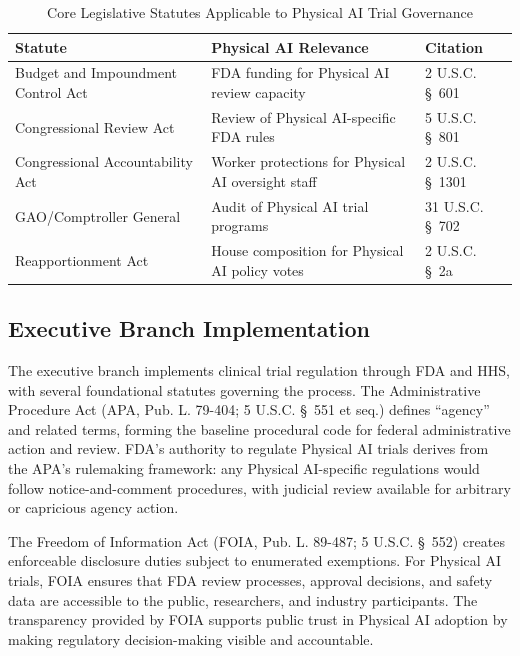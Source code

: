 \begin{table}[H]
\centering
\caption{Core Legislative Statutes Applicable to Physical AI Trial Governance}
\label{tab:legislative-statutes}
\small
\begin{tabularx}{\textwidth}{l X l}
\toprule
\textbf{Statute} & \textbf{Physical AI Relevance} & \textbf{Citation} \\
\midrule
Budget and Impoundment Control Act & FDA funding for Physical AI review capacity & 2 U.S.C. \S~601 \\
Congressional Review Act & Review of Physical AI-specific FDA rules & 5 U.S.C. \S~801 \\
Congressional Accountability Act & Worker protections for Physical AI oversight staff & 2 U.S.C. \S~1301 \\
GAO/Comptroller General & Audit of Physical AI trial programs & 31 U.S.C. \S~702 \\
Reapportionment Act & House composition for Physical AI policy votes & 2 U.S.C. \S~2a \\
\bottomrule
\end{tabularx}
\end{table}

\subsection{Executive Branch Implementation}
\label{subsec:executive}

The executive branch implements clinical trial regulation through FDA and HHS,
with several foundational statutes governing the process. The Administrative
Procedure Act (APA, Pub. L. 79-404; 5 U.S.C. \S~551 et seq.) defines
``agency'' and related terms, forming the baseline procedural code for federal
administrative action and review. FDA's authority to regulate Physical AI trials
derives from the APA's rulemaking framework: any Physical AI-specific
regulations would follow notice-and-comment procedures, with judicial review
available for arbitrary or capricious agency action.

The Freedom of Information Act (FOIA, Pub. L. 89-487; 5 U.S.C. \S~552)
creates enforceable disclosure duties subject to enumerated exemptions. For
Physical AI trials, FOIA ensures that FDA review processes, approval decisions,
and safety data are accessible to the public, researchers, and industry
participants. The transparency provided by FOIA supports public trust in
Physical AI adoption by making regulatory decision-making visible and
accountable.

